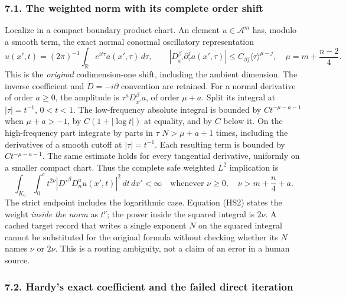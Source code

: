\documentclass[
  11pt,
]{article}
\begin{document}
\subsubsection{7.1. The weighted norm with its complete order
shift}\label{the-weighted-norm-with-its-complete-order-shift}

Localize in a compact boundary product chart. An element
\(u\in\mathcal A^m\) has, modulo a smooth term, the exact normal
conormal oscillatory representation \[
 u(x',t)=(2\pi)^{-1}\int_{\mathbb R}
         e^{it\tau}a(x',\tau)\,d\tau,
 \qquad
 |D_{x'}^\beta\partial_\tau^j a(x',\tau)|
     \le C_{\beta j}\langle\tau\rangle^{\mu-j},
 \quad \mu=m+\frac{n-2}{4}.
 \tag{HS1}
\] This is the \emph{original} codimension-one shift, including the
ambient dimension. The inverse coefficient and \(D=-i\partial\)
convention are retained. For a normal derivative of order \(a\ge0\), the
amplitude is \(\tau^aD_{x'}^\beta a\), of order \(\mu+a\). Split its
integral at \(|\tau|=t^{-1}\), \(0<t<1\). The low-frequency absolute
integral is bounded by \(Ct^{-\mu-a-1}\) when \(\mu+a>-1\), by
\(C(1+|\log t|)\) at equality, and by \(C\) below it. On the
high-frequency part integrate by parts in \(\tau\) \(N>\mu+a+1\) times,
including the derivatives of a smooth cutoff at \(|\tau|=t^{-1}\). Each
resulting term is bounded by \(Ct^{-\mu-a-1}\). The same estimate holds
for every tangential derivative, uniformly on a smaller compact chart.
Thus the complete safe weighted \(L^2\) implication is \[
 \int_{K_0}\int_0^c
     t^{2\nu}|D'^\beta D_n^a u(x',t)|^2
                       \,dt\,dx'<\infty
 \quad\text{whenever }
 \nu\ge0,\quad \nu>m+\frac n4+a.
 \tag{HS2}
\] The strict endpoint includes the logarithmic case. Equation (HS2)
states the weight \emph{inside the norm} as \(t^\nu\); the power inside
the squared integral is \(2\nu\). A cached target record that writes a
single exponent \(N\) on the squared integral cannot be substituted for
the original formula without checking whether its \(N\) names \(\nu\) or
\(2\nu\). This is a routing ambiguity, not a claim of an error in a
human source.

\subsubsection{7.2. Hardy's exact coefficient and the failed direct
iteration}\label{hardys-exact-coefficient-and-the-failed-direct-iteration}
\end{document}
